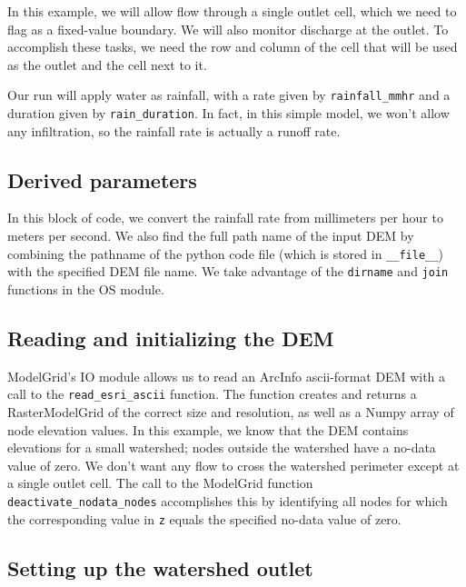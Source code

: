 \documentclass[12pt]{article}
\newcommand{\code}[1]{{\tt #1}}
\begin{document}
In this example, we will allow flow through a single outlet cell, which we need to flag as a fixed-value boundary. We will also monitor discharge at the outlet. To accomplish these tasks, we need the row and column of the cell that will be used as the outlet and the cell next to it.

Our run will apply water as rainfall, with a rate given by \code{rainfall\_mmhr} and a duration given by \code{rain\_duration}. In fact, in this simple model, we won't allow any infiltration, so the rainfall rate is actually a runoff rate.

\subsection{Derived parameters}



In this block of code, we convert the rainfall rate from millimeters per hour to meters per second. We also find the full path name of the input DEM by combining the pathname of the python code file (which is stored in \code{\_\_file\_\_}) with the specified DEM file name. We take advantage of the \code{dirname} and \code{join} functions in the OS module.

\subsection{Reading and initializing the DEM}



ModelGrid's IO module allows us to read an ArcInfo ascii-format DEM with a call to the \code{read\_esri\_ascii} function. The function creates and returns a RasterModelGrid of the correct size and resolution, as well as a Numpy array of node elevation values. In this example, we know that the DEM contains elevations for a small watershed; nodes outside the watershed have a no-data value of zero. We don't want any flow to cross the watershed perimeter except at a single outlet cell. The call to the ModelGrid function \code{deactivate\_nodata\_nodes} accomplishes this by identifying all nodes for which the corresponding value in \code{z} equals the specified no-data value of zero.

\subsection{Setting up the watershed outlet}
\end{document}
